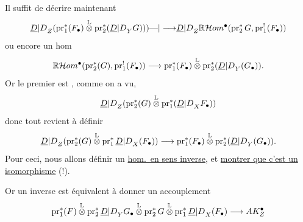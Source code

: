 Il suffit de décrire maintenant
\[
{\underline{D}|D}_Z(\operatorname{pr}_1^*(F_\bullet)\overset{\mathbb{L}}{\otimes}\operatorname{pr}_2^*({\underline{D}|D}_Y G))){\text{---}|\longrightarrow}{\underline{D}|D}_Z\mathbb{R}\mathcal{H}om^\bullet(\operatorname{pr}_2^*G,\operatorname{pr}_1^!(F_\bullet))
\]
 ou encore un hom
\[
\mathbb{R}\mathcal{H}om^\bullet(\operatorname{pr}_2^*(G),\operatorname{pr}_1^!(F_\bullet))\longrightarrow\operatorname{pr}_1^*(F_\bullet)\overset{\mathbb{L}}{\otimes}\operatorname{pr}_2^*({\underline{D}|D}_Y(G_\bullet)).
\]
Or le premier est , comme on a vu, 
\[
{\underline{D}|D}_Z(\operatorname{pr}_2^*(G)\overset{\mathbb{L}}{\otimes}\operatorname{pr}_1^*({\underline{D}|D}_X F_\bullet))
\]
donc tout revient à définir
\[
{\underline{D}|D}_Z(\operatorname{pr}_2^*(G)\overset{\mathbb{L}}{\otimes}\operatorname{pr}_1^*{\underline{D}|D}_X(F_\bullet))\longrightarrow\operatorname{pr}_1^*(F_\bullet)\overset{\mathbb{L}}{\otimes}\operatorname{pr}_2^*({\underline{D}|D}_Y(G_\bullet)).
\]
Pour ceci, nous allons définir un \uline{hom.\ en sens inverse}, et \uline{montrer que c'est un isomorphisme} (!).

Or  un  inverse est équivalent à donner un accouplement
\[
\operatorname{pr}_1^*(F)\overset{\mathbb{L}}{\otimes}\operatorname{pr}_2^*{\underline{D}|D}_Y G_\bullet\overset{\mathbb{L}}{\otimes}\operatorname{pr}_2^*G\overset{\mathbb{L}}{\otimes}\operatorname{pr}_1^*{\underline{D}|D}_X(F_\bullet)\longrightarrow{{A}}K_Z^\bullet
\]

